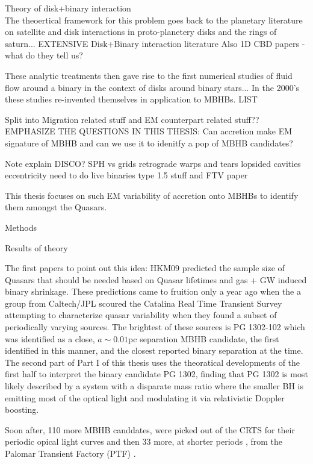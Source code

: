 Theory of disk+binary interaction\\
The theoertical framework for this problem goes back to the planetary literature on satellite and disk interactions in proto-planetery disks and the rings of saturn...
EXTENSIVE Disk+Binary interaction literature
Also 1D CBD papers - what do they tell us?

These analytic treatments then gave rise to the first numerical studies of fluid flow around a binary in the context of disks around binary stars... In the 2000's these studies re-invented themselves in application to MBHBs. LIST


Split into Migration related stuff and EM counterpart related stuff??
EMPHASIZE THE QUESTIONS IN THIS THESIS: Can accretion make EM signature of MBHB and can we use it to idenitfy a pop of MBHB candidates?

Note
explain DISCO?
SPH vs grids
retrograde
warps and tears
lopsided cavities
eccentricity
need to do live binaries type 1.5 stuff and FTV paper





This thesis focuses on such EM variability of accretion onto MBHBs to identify
them amongst the Quasars.

Methods

Results of theory

The first papers to point out this idea: HKM09 predicted the sample size of
Quasars that should be needed based on Quasar lifetimes and gas + GW induced
binary shrinkage. These predictions came to fruition only a year ago when the
a group from Caltech/JPL scoured the Catalina Real Time Transient Survey
 attempting to characterize quasar variability when they
found a subset of periodically varying sources. The brightest of these sources
is PG 1302-102 which was identified as a close, $a \sim 0.01$pc separation
MBHB candidate, the first identified in this manner, and the closest reported
binary separation at the time. The second part of Part I of this thesis uses
the theoratical developments of the first half to interpret the binary
candidate PG 1302, finding that PG 1302 is most likely described by a system
with a disparate mass ratio where the smaller BH is emitting most of the
optical light and modulating it via relativistic Doppler boosting.


Soon after, 110 more MBHB canddates, were picked out of the CRTS for
their periodic opical light curves \citep{Graham:2015b} and then 33 more, at
shorter periods \citep{CharisiMBHBs:2016}, from the Palomar Transient Factory
(PTF) \citep{}.

